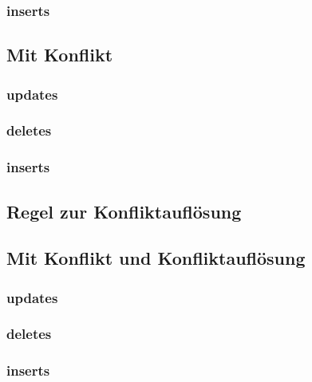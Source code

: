 \documentclass[11pt,a4paper,parskip=half]{scrartcl}
\begin{document}
\subsubsection{inserts}

\subsection{Mit Konflikt}
\subsubsection{updates}

\subsubsection{deletes}

\subsubsection{inserts}

\subsection{Regel zur Konfliktauflösung}

\subsection{Mit Konflikt und Konfliktauflösung}
\subsubsection{updates}

\subsubsection{deletes}

\subsubsection{inserts}
\end{document}
